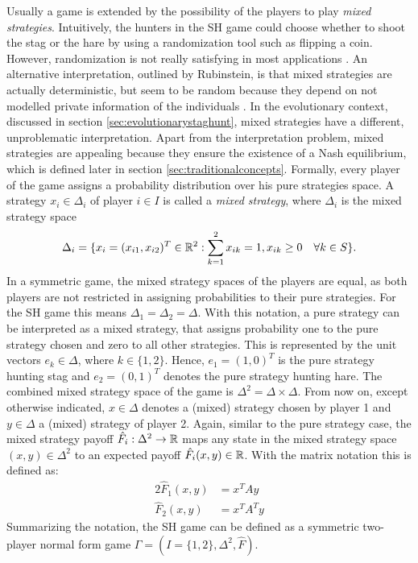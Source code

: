 Usually a game is extended by the possibility of the players to play
\textit{mixed strategies}. 
Intuitively, the hunters in the SH game could  
choose whether to shoot the stag or the hare by using a randomization
tool such as flipping a coin. However, randomization is not really
satisfying in most applications \parencite{radner_private_1982}. An
alternative interpretation, outlined by Rubinstein, is that mixed 
strategies are actually deterministic, but seem to be random because they 
depend on not modelled private information of the individuals 
\parencite[914]{rubinstein_comments_1991}. In the evolutionary context,
discussed in section \ref{sec:evolutionarystaghunt}, mixed strategies have
a different, unproblematic interpretation. Apart from the interpretation 
problem, mixed strategies are appealing because they ensure the existence
of a Nash equilibrium, which is defined later in section 
\ref{sec:traditionalconcepts}.
Formally, every player of the game assigns a probability distribution over
his pure strategies space. A strategy $x_i \in \Delta_i$ of 
player $i \in I$ is called a \textit{mixed strategy}, where $\Delta_i$ is 
the mixed strategy space 
\begin{align*}
        \Delta_i = \{ x_i = (x_{i1}, x_{i2})^T \in \mathbb{R}^2 : 
                \sum_{k=1}^2 x_{ik} = 1, x_{ik} \geq 0 \quad
\forall k \in S\}.
\end{align*}
In a symmetric game, the mixed strategy spaces of the players are
equal, as both players are not restricted in assigning probabilities to their
pure strategies. For the SH game this means $\Delta_1 = \Delta_2 = \Delta$.
With this notation, a pure strategy can be interpreted as a mixed strategy,
that assigns probability one to the pure strategy chosen and zero to all
other strategies. This is represented by the unit vectors 
$e_k \in \Delta$, where $k \in \{1,2\}$. 
Hence, $e_1 = (1,0)^T$ is the pure strategy hunting stag 
and $e_2 =(0,1)^T$ denotes the pure strategy hunting hare.
The combined mixed strategy space of the game is $\Delta^2 = \Delta \times
\Delta$.
From now on, except otherwise indicated, $x \in \Delta$ 
denotes a (mixed) strategy
chosen by player 1 and $y \in \Delta$ a (mixed) strategy of player 2.
Again, similar to the pure strategy case, the mixed strategy payoff 
$\hat{F}_i:\Delta^2 \rightarrow \mathbb{R}$ maps 
any state in the mixed strategy
space  $(x,y) \in \Delta^2$ to an expected payoff 
$\hat{F}_i(x,y) \in \mathbb{R}$.
With the matrix notation this is defined as: 
\begin{alignat*}{2}
        \hat{F}_1(x,y) &= x^T A y \\
        \hat{F}_2(x,y) &= x^T A^T y 
\end{alignat*}
Summarizing the notation, the SH game can be defined as a symmetric two-player
normal form game $\Gamma = (I=\{1,2\}, \Delta^2, \hat{F})$.

